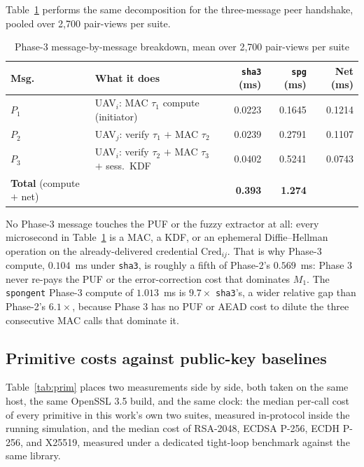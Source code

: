 \documentclass[journal]{IEEEtran}
\begin{document}
Table~\ref{tab:p3msg} performs the same decomposition for the three-message
peer handshake, pooled over 2{,}700 pair-views per suite.

\begin{table}[H]
\centering
\caption{Phase-3 message-by-message breakdown, mean over 2{,}700 pair-views per
suite}
\label{tab:p3msg}
\tiny
\setlength{\tabcolsep}{2.2pt}
\begin{tabular}{@{}p{0.8cm}p{4.85cm}rrr@{}}
\toprule
\textbf{Msg.} & \textbf{What it does} & \textbf{\texttt{sha3} (ms)} &
\textbf{\texttt{spg} (ms)} & \textbf{Net (ms)} \\
\midrule
$P_1$ & UAV$_i$: MAC $\tau_1$ compute (initiator) & 0.0223 & 0.1645 & 0.1214 \\
$P_2$ & UAV$_j$: verify $\tau_1$ $+$ MAC $\tau_2$ & 0.0239 & 0.2791 & 0.1107 \\
$P_3$ & UAV$_i$: verify $\tau_2$ $+$ MAC $\tau_3$ $+$ sess.\ KDF & 0.0402 & 0.5241 & 0.0743 \\
\midrule
\textbf{Total} (compute $+$ net) & & \textbf{0.393} & \textbf{1.274} & \\
\bottomrule
\end{tabular}
\end{table}

No Phase-3 message touches the PUF or the fuzzy extractor at all: every
microsecond in Table~\ref{tab:p3msg} is a MAC, a KDF, or an ephemeral
Diffie--Hellman operation on the already-delivered credential $\text{Cred}_{ij}$.
That is why Phase-3 compute, $0.104$~ms under \texttt{sha3}, is roughly a
fifth of Phase-2's $0.569$~ms: Phase 3 never re-pays the PUF or the
error-correction cost that dominates $M_1$. The \texttt{spongent} Phase-3
compute of $1.013$~ms is $9.7\times$ \texttt{sha3}'s, a wider relative gap than
Phase-2's $6.1\times$, because Phase 3 has no PUF or AEAD cost to dilute the
three consecutive MAC calls that dominate it.

\subsection{Primitive costs against public-key baselines}

Table~\ref{tab:prim} places two measurements side by side, both taken on the
same host, the same OpenSSL 3.5 build, and the same clock: the median per-call
cost of every primitive in this work's own two suites, measured in-protocol
inside the running simulation, and the median cost of RSA-2048, ECDSA P-256,
ECDH P-256, and X25519, measured under a dedicated tight-loop benchmark against
the same library.
\end{document}
